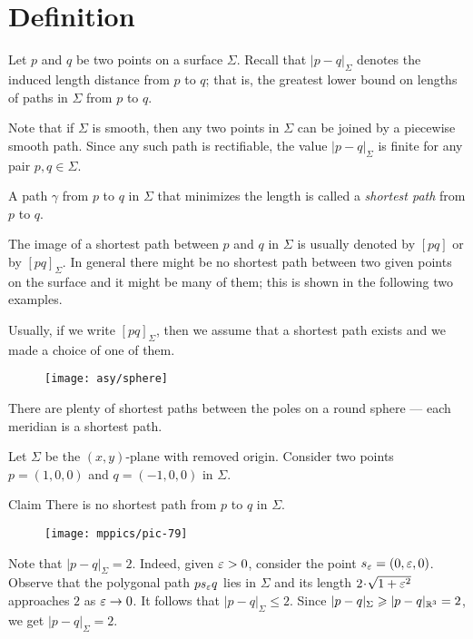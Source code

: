 \section{Definition}

Let $p$ and $q$ be two points on a surface $\Sigma$.
Recall that $|p-q|_\Sigma$ denotes the induced length distance from $p$ to $q$;
that is, the greatest lower bound on lengths of paths in $\Sigma$ from $p$ to $q$.

Note that if $\Sigma$ is smooth, then any two points in $\Sigma$ can be joined by a piecewise smooth path.
Since any such path is rectifiable, the value $|p-q|_\Sigma$ is finite for any pair $p,q\in\Sigma$.

A path $\gamma$ from $p$ to $q$ in $\Sigma$ that minimizes the length is called a \emph{shortest path} from $p$ to $q$.

The image of a shortest path between $p$ and $q$ in $\Sigma$ is usually denoted by $[pq]$ or by $[pq]_\Sigma$.
In general there might be no shortest path between two given points on the surface
and it might be many of them;
this is shown in the following two examples.

Usually, if we write $[pq]_\Sigma$, then we assume that a shortest path exists and we made a choice of one of them.

{

\begin{wrapfigure}{r}{28 mm}
\vskip-6mm
\centering
\texttt{[image: asy/sphere]}
\end{wrapfigure}

 There are plenty of shortest paths between the poles on a round sphere --- each meridian is a shortest path.

 Let $\Sigma$ be the $(x,y)$-plane with removed origin.
Consider two points $p=(1,0,0)$ and $q=(-1,0,0)$ in $\Sigma$.

}

\begin{thm}{Claim}
There is no shortest path from $p$ to $q$ in $\Sigma$.
\end{thm}

\begin{wrapfigure}{r}{28 mm}
\vskip-4mm
\centering
\texttt{[image: mppics/pic-79]}
\end{wrapfigure}

Note that $|p-q|_\Sigma=2$. 
Indeed, given $\eps\z>0$, consider the point $s_\varepsilon=(0,\varepsilon,0)$.
Observe that the polygonal path $ps_\varepsilon q$ lies in $\Sigma$ and its length $2\cdot\sqrt{1+\eps^2}$ approaches $2$ as $\varepsilon\to0$.
It follows that $|p-q|_\Sigma\le 2$.
Since $|p-q|_\Sigma\geqslant |p-q|_{\mathbb{R}^3}=2$, we get $|p-q|_\Sigma=2$.


